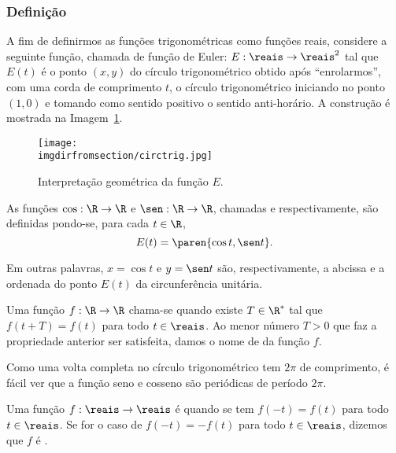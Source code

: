 \subsubsection{Definição}

A fim de definirmos as funções trigonométricas como funções
reais, considere a seguinte função, chamada de função de Euler: $E:
\reais \to \reais^2$ tal que $E(t)$ é o ponto $(x, y)$ do círculo
trigonométrico obtido após ``enrolarmos'', com uma corda de comprimento
$t$, o círculo trigonométrico iniciando no ponto $(1, 0)$ e tomando
como sentido positivo o sentido anti-horário. 
A construção é mostrada na Imagem~\ref{fig:ciclo-trigonometrico}.

\begin{figure}[H]
\centering
\texttt{[image: \\imgdirfromsection/circtrig.jpg]}
\caption{Interpretação geométrica da função $E$.}
\label{fig:ciclo-trigonometrico}
\end{figure}

\begin{definition}
    As funções $\cos : \R \to \R$ e $\sen : \R \to \R$, chamadas
 e  respectivamente, são
definidas pondo-se, para cada $t \in \R$,
$$E(t) = \paren{\cos t , \sen t}.$$

Em outras palavras, $x= \cos t$ e $y = \sen t$ são, respectivamente,
a abcissa e a ordenada do ponto $E(t)$ da circunferência unitária.
\end{definition}

\begin{definition}
    Uma função $f: \R \to \R$ chama-se  quando existe $T
\in \R^\ast$ tal que $f(t + T) = f(t)$ para todo $t \in \reais$. Ao
menor número $T>0$ que faz a propriedade anterior ser satisfeita,
damos o nome de  da função $f$.
\end{definition}

\begin{remark}
    Como uma volta completa no círculo trigonométrico tem $2 \pi$ de
comprimento, é fácil ver que a função seno e cosseno são periódicas
de período $2\pi$.
\end{remark}

\begin{definition}
\label{def:funcao-par-impar}
    Uma função $f: \reais \to \reais$ é  quando se tem $f(-t) = f(t)$
para todo $t\in \reais$. Se for o caso de $f(-t) = - f(t)$ para todo $t
\in \reais$, dizemos que $f$ é .
\end{definition}

